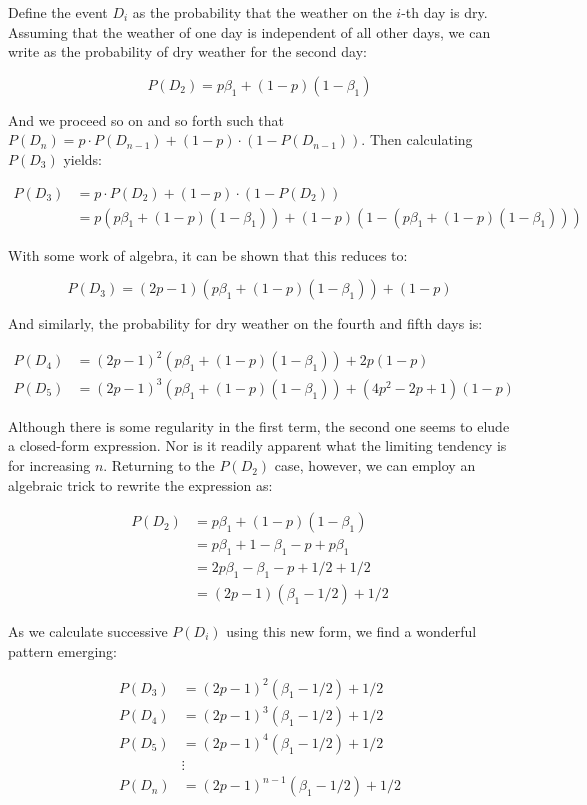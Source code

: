 \documentclass[10pt, oneside]{article}   	%
\theoremstyle{definition}
\begin{document}
\begin{enumerate}[label=3.\arabic*]
   Define the event $D_i$ as the probability that the weather on the $i$-th day is dry. Assuming that the weather of one day is independent of all other days, we can write as the probability of dry weather for the second day:
   
   \[ P(D_2) = p \beta_1 + (1-p)(1 - \beta_1) \]
   
   And we proceed so on and so forth such that $P(D_{n}) = p \cdot P(D_{n-1}) + (1-p) \cdot (1 - P(D_{n-1}))$. Then calculating $P(D_3)$ yields:
   
   \begin{align*}
   P(D_{3}) &= p \cdot P(D_{2}) + (1-p) \cdot (1 - P(D_{2})) \\
   &= p(p \beta_1 + (1-p)(1 - \beta_1)) + (1-p) (1 - (p \beta_1 + (1-p)(1 - \beta_1)))
   \end{align*}
   
   With some work of algebra, it can be shown that this reduces to:
   
   \[ P(D_3) = (2p-1)(p \beta_1 + (1-p)(1 - \beta_1)) + (1-p) \]
   
   And similarly, the probability for dry weather on the fourth and fifth days is:
   
   \begin{align*}
   P(D_4) &= (2p-1)^2 (p \beta_1 + (1-p)(1 - \beta_1)) + 2p(1-p) \\
   P(D_5) &= (2p-1)^3 (p \beta_1 + (1-p)(1 - \beta_1)) + (4p^2 - 2p + 1)(1-p)
   \end{align*}
   
   Although there is some regularity in the first term, the second one seems to elude a closed-form expression. Nor is it readily apparent what the limiting tendency is for increasing $n$. Returning to the $P(D_2)$ case, however, we can employ an algebraic trick to rewrite the expression as:
   
   \begin{align*}
   P(D_2) &= p \beta_1 + (1-p)(1 - \beta_1) \\
   &= p \beta_1 + 1 - \beta_1 - p + p \beta_1 \\
   &= 2p \beta_1 - \beta_1 - p + 1/2 + 1/2 \\
   &= (2p - 1)(\beta_1 - 1/2) + 1/2
   \end{align*}
   
   As we calculate successive $P(D_i)$ using this new form, we find a wonderful pattern emerging:
   
   \begin{align*}
   P(D_3) &= (2p - 1)^2 (\beta_1 - 1/2) + 1/2 \\
   P(D_4) &= (2p - 1)^3 (\beta_1 - 1/2) + 1/2 \\
   P(D_5) &= (2p - 1)^4 (\beta_1 - 1/2) + 1/2 \\
   &\vdots \\
   P(D_n) &= (2p - 1)^{n-1} (\beta_1 - 1/2) + 1/2
   \end{align*}
   

\end{enumerate}
\end{document}
